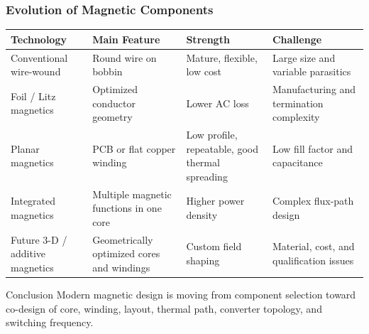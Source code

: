 \begin{frame}
    \frametitle{Evolution of Magnetic Components}

    \scriptsize
    \begin{table}
        \centering
        \begin{tabular}{p{}p{}p{}p{}}
            \hline
            \textbf{Technology} & \textbf{Main Feature} & \textbf{Strength} & \textbf{Challenge}\\
            \hline
            Conventional wire-wound & Round wire on bobbin & Mature, flexible, low cost & Large size and variable parasitics\\
            Foil / Litz magnetics & Optimized conductor geometry & Lower AC loss & Manufacturing and termination complexity\\
            Planar magnetics & PCB or flat copper winding & Low profile, repeatable, good thermal spreading & Low fill factor and capacitance\\
            Integrated magnetics & Multiple magnetic functions in one core & Higher power density & Complex flux-path design\\
            Future 3-D / additive magnetics & Geometrically optimized cores and windings & Custom field shaping & Material, cost, and qualification issues\\
            \hline
        \end{tabular}
    \end{table}

    \vspace{0.15cm}

    \begin{block}{Conclusion}
        \small
        Modern magnetic design is moving from component selection toward co-design of core, winding, layout, thermal path, converter topology, and switching frequency.
    \end{block}
\end{frame}


